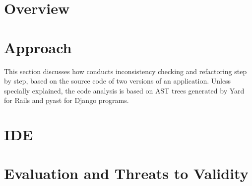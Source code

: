 
\section{Overview}


 


\section{Approach}
\label{sec:approach}
This section discusses how \ETool conducts inconsistency checking and refactoring
step by step, based on the source code of 
two versions of an application.
Unless specially explained,
the code analysis is based on
AST trees generated by Yard \cite{yard} for Rails
 and 
pyast \cite{pyparser} for Django programs.



\section{\ETool{} IDE}


\section{Evaluation and Threats to Validity}




 